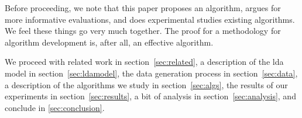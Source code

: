 
Before proceeding, we note that this paper proposes an algorithm,
argues for more informative evaluations, and does experimental studies
existing algorithms.  We feel these things go very much together.  The
proof for a methodology for algorithm development is, after all, an
effective algorithm.

We proceed with related work in section~\ref{sec:related}, a
description of the lda model in section~\ref{sec:ldamodel}, the data
generation process in section~\ref{sec:data}, a description of the
algorithms we study in section~\ref{sec:algs}, the results of our
experiments in section~\ref{sec:results}, a bit of analysis in
section~\ref{sec:analysis}, and conclude in \ref{sec:conclusion}.


